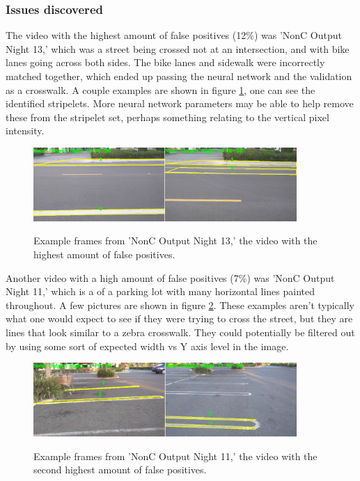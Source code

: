 \documentclass[12pt]{ucthesis}
\newcommand{\captionfonts}{\small\bf\ssp}
\begin{document}
\subsubsection{Issues discovered}

The video with the highest amount of false positives (12\%) was 'NonC Output Night 13,' which was a street being crossed not at an intersection, and with bike lanes going across both sides. The bike lanes and sidewalk were incorrectly matched together, which ended up passing the neural network and the validation as a crosswalk. A couple examples are shown in figure \ref{fig:worstFalsePosPic}, one can see the identified stripelets. More neural network parameters may be able to help remove these from the stripelet set, perhaps something relating to the vertical pixel intensity. 

\begin{figure}[H]
\begin{center}
\includegraphics[width=10cm]{NonCWorstCwalk.png}
\captionfonts
\caption[Worst False Positive Examples]{Example frames from 'NonC Output Night 13,' the video with the highest amount of false positives.}
\label{fig:worstFalsePosPic}
\end{center}
\end{figure}

Another video with a high amount of false positives (7\%) was 'NonC Output Night 11,' which is a of a parking lot with many horizontal lines painted throughout.  A few pictures are shown in figure \ref{fig:2ndworstFalsePosPic}. These examples aren't typically what one would expect to see if they were trying to cross the street, but they are lines that look similar to a zebra crosswalk. They could potentially be filtered out by using some sort of expected width vs Y axis level in the image. 

\begin{figure}[H]
\begin{center}
\includegraphics[width=10cm]{NonC2ndWorstCwalk.png}
\captionfonts
\caption[Second Worst False Positive Examples]{Example frames from 'NonC Output Night 11,' the video with the second highest amount of false positives.}
\label{fig:2ndworstFalsePosPic}
\end{center}
\end{figure}
\end{document}
